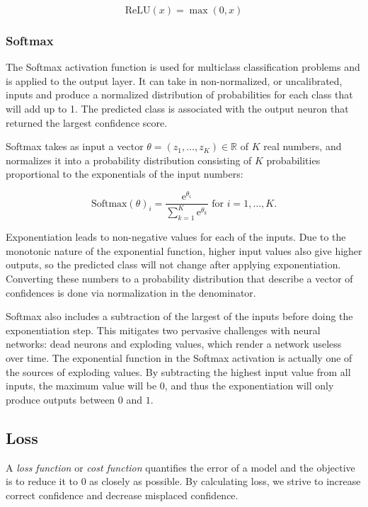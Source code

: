 \documentclass[a4paper]{report}
\newcommand{\euler}{\mathrm{e}}
\begin{document}
\begin{equation*}
    \text{ReLU}(x) = \max(0, x)
\end{equation*}

\subsubsection*{Softmax}
The Softmax activation function is used for multiclass classification problems and is applied to the output layer. It can take in non-normalized, or uncalibrated, inputs and produce a normalized distribution of probabilities for each class that will add up to 1. The predicted class is associated with the output neuron that returned the largest confidence score.

Softmax takes as input a vector $\theta = (z_1, \ldots, z_K) \in \mathbb{R}$ of $K$ real numbers, and normalizes it into a probability distribution consisting of $K$ probabilities proportional to the exponentials of the input numbers:

\begin{equation*}
    \text{Softmax}(\theta)_i = \frac{\euler^{\theta_i}}{\sum_{k=1}^K \euler^{\theta_k}} \text{ for } i = 1, \ldots, K.
\end{equation*}

Exponentiation leads to non-negative values for each of the inputs. Due to the monotonic nature of the exponential function, higher input values also give higher outputs, so the predicted class will not change after applying exponentiation. Converting these numbers to a probability distribution that describe a vector of confidences is done via normalization in the denominator.

Softmax also includes a subtraction of the largest of the inputs before doing the exponentiation step. This mitigates two pervasive challenges with neural networks: dead neurons and exploding values, which render a network useless over time. The exponential function in the Softmax activation is actually one of the sources of exploding values. By subtracting the highest input 
value from all inputs, the maximum value will be $0$, and thus the exponentiation will only produce 
outputs between $0$ and $1$.

\subsection*{Loss}
A \emph{loss function} or \emph{cost function} quantifies the error of a model and the objective is to reduce it to $0$ as closely as possible. By calculating loss, we strive to increase correct confidence and decrease misplaced confidence.
\end{document}
